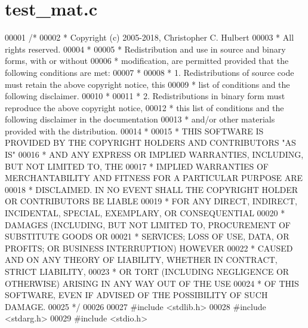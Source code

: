 \hypertarget{test__mat_8c_source}{}\section{test\+\_\+mat.\+c}
\label{test__mat_8c_source}

\begin{DoxyCode}
00001 \textcolor{comment}{/*}
00002 \textcolor{comment}{ * Copyright (c) 2005-2018, Christopher C. Hulbert}
00003 \textcolor{comment}{ * All rights reserved.}
00004 \textcolor{comment}{ *}
00005 \textcolor{comment}{ * Redistribution and use in source and binary forms, with or without}
00006 \textcolor{comment}{ * modification, are permitted provided that the following conditions are met:}
00007 \textcolor{comment}{ *}
00008 \textcolor{comment}{ * 1. Redistributions of source code must retain the above copyright notice, this}
00009 \textcolor{comment}{ *    list of conditions and the following disclaimer.}
00010 \textcolor{comment}{ *}
00011 \textcolor{comment}{ * 2. Redistributions in binary form must reproduce the above copyright notice,}
00012 \textcolor{comment}{ *    this list of conditions and the following disclaimer in the documentation}
00013 \textcolor{comment}{ *    and/or other materials provided with the distribution.}
00014 \textcolor{comment}{ *}
00015 \textcolor{comment}{ * THIS SOFTWARE IS PROVIDED BY THE COPYRIGHT HOLDERS AND CONTRIBUTORS "AS IS"}
00016 \textcolor{comment}{ * AND ANY EXPRESS OR IMPLIED WARRANTIES, INCLUDING, BUT NOT LIMITED TO, THE}
00017 \textcolor{comment}{ * IMPLIED WARRANTIES OF MERCHANTABILITY AND FITNESS FOR A PARTICULAR PURPOSE ARE}
00018 \textcolor{comment}{ * DISCLAIMED. IN NO EVENT SHALL THE COPYRIGHT HOLDER OR CONTRIBUTORS BE LIABLE}
00019 \textcolor{comment}{ * FOR ANY DIRECT, INDIRECT, INCIDENTAL, SPECIAL, EXEMPLARY, OR CONSEQUENTIAL}
00020 \textcolor{comment}{ * DAMAGES (INCLUDING, BUT NOT LIMITED TO, PROCUREMENT OF SUBSTITUTE GOODS OR}
00021 \textcolor{comment}{ * SERVICES; LOSS OF USE, DATA, OR PROFITS; OR BUSINESS INTERRUPTION) HOWEVER}
00022 \textcolor{comment}{ * CAUSED AND ON ANY THEORY OF LIABILITY, WHETHER IN CONTRACT, STRICT LIABILITY,}
00023 \textcolor{comment}{ * OR TORT (INCLUDING NEGLIGENCE OR OTHERWISE) ARISING IN ANY WAY OUT OF THE USE}
00024 \textcolor{comment}{ * OF THIS SOFTWARE, EVEN IF ADVISED OF THE POSSIBILITY OF SUCH DAMAGE.}
00025 \textcolor{comment}{ */}
00026 
00027 \textcolor{preprocessor}{#include <stdlib.h>}
00028 \textcolor{preprocessor}{#include <stdarg.h>}
00029 \textcolor{preprocessor}{#include <stdio.h>}

\end{DoxyCode}
